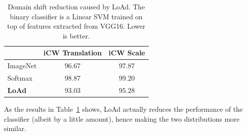 \documentclass[../main.tex]{subfiles}
\begin{document}
    \begin{table}[!ht]
        \centering{}
        \begin{tabular}{l c c}
            \toprule
            & iCW Translation & iCW Scale \\
            \midrule
            ImageNet & 96.67 & 97.87 \\
            Softmax  & 98.87 & 99.20 \\
        \textbf{LoAd} & $\mathbf{93.03}$ & $\mathbf{95.28}$ \\
            \bottomrule
        \end{tabular}
        \caption{Domain shift reduction caused by LoAd\@. The binary classifier is a Linear SVM trained on top of
        features extracted from VGG16. Lower is better.}\label{table:domain-shift-LoAd}
    \end{table}
    
    As the results in Table~\ref{table:domain-shift-LoAd}
    shows, LoAd actually reduces the performance of the classifier (albeit by a little amount), hence making the
    two distributions more similar.
\end{document}
